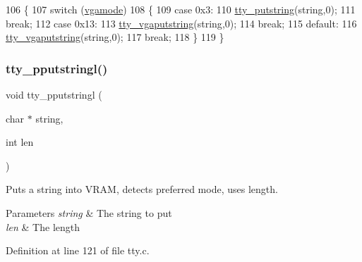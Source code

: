 \begin{DoxyCode}
106                                   \{
107     \textcolor{keywordflow}{switch} (\hyperlink{a00173_af93b0649fdd1bea5b6d29ed37205aa2c_af93b0649fdd1bea5b6d29ed37205aa2c}{vgamode})
108     \{
109     \textcolor{keywordflow}{case} 0x3:
110         \hyperlink{a00173_a5b5bf610a57f3c59b2851fa2652081ec_a5b5bf610a57f3c59b2851fa2652081ec}{tty\_putstring}(\textcolor{keywordtype}{string},0);
111         \textcolor{keywordflow}{break};
112     \textcolor{keywordflow}{case} 0x13:
113         \hyperlink{a00173_a05ca3f5e64f38fec173b635ca8465415_a05ca3f5e64f38fec173b635ca8465415}{tty\_vgaputstring}(\textcolor{keywordtype}{string},0);
114         \textcolor{keywordflow}{break};
115     \textcolor{keywordflow}{default}:
116         \hyperlink{a00173_a05ca3f5e64f38fec173b635ca8465415_a05ca3f5e64f38fec173b635ca8465415}{tty\_vgaputstring}(\textcolor{keywordtype}{string},0);
117         \textcolor{keywordflow}{break};
118     \}
119 \}
\end{DoxyCode}
\mbox{\label{a00176_abaf93f9e56ddb7b10462070f59e534e4_abaf93f9e56ddb7b10462070f59e534e4}} 
\subsubsection{\texorpdfstring{tty\+\_\+pputstringl()}{tty\_pputstringl()}}
{\footnotesize\ttfamily void tty\+\_\+pputstringl (\begin{DoxyParamCaption}\item[{char $\ast$}]{string,  }\item[{int}]{len }\end{DoxyParamCaption})}



Puts a string into V\+R\+AM, detects preferred mode, uses length. 


\begin{DoxyParams}{Parameters}
{\em string} & The string to put \\
\hline
{\em len} & The length \\
\hline
\end{DoxyParams}


Definition at line 121 of file tty.\+c.


